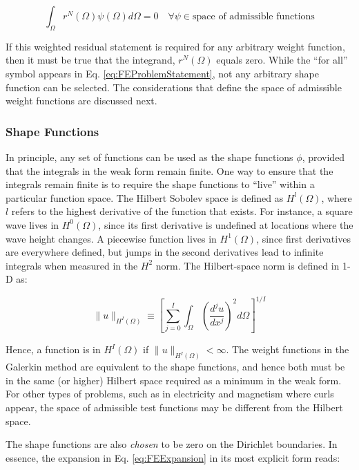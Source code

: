\documentclass[10pt]{article}
\numberwithin{equation}{section} %
\begin{document}
\begin{equation}
\label{eq:FEProblemStatement}
\int_{\Omega}r^N(\Omega)\psi(\Omega)d\Omega=0\quad\forall\psi\in \text{space of admissible functions}
\end{equation}

If this weighted residual statement is required for any arbitrary weight function, then it must be true that the integrand, \(r^N(\Omega)\) equals zero. While the ``for all'' symbol appears in Eq. \eqref{eq:FEProblemStatement}, not any arbitrary shape function can be selected. The considerations that define the space of admissible weight functions are discussed next.

\subsubsection{Shape Functions}

In principle, any set of functions can be used as the shape functions \(\phi\), provided that the integrals in the weak form remain finite. One way to ensure that the integrals remain finite is to require the shape functions to ``live'' within a particular function space. The Hilbert Sobolev space is defined as \(H^l(\Omega)\), where \(l\) refers to the highest derivative of the function that exists. For instance, a square wave lives in \(H^0(\Omega)\), since its first derivative is undefined at locations where the wave height changes. A piecewise function lives in \(H^1(\Omega)\), since first derivatives are everywhere defined, but jumps in the second derivatives lead to infinite integrals when measured in the \(H^2\) norm. The Hilbert-space norm is defined in 1-D as:

\begin{equation}
\|u\|_{H^I(\Omega)}\equiv\left\lbrack\sum_{j=0}^{I}\int_{\Omega}\left(\frac{d^ju}{dx^j}\right)^2d\Omega\right\rbrack^{1/I}
\end{equation}

Hence, a function is in \(H^I(\Omega)\) if \(\|u\|_{H^I(\Omega)}<\infty\). The weight functions in the Galerkin method are equivalent to the shape functions, and hence both must be in the same (or higher) Hilbert space required as a minimum in the weak form. For other types of problems, such as in electricity and magnetism where curls appear, the space of admissible test functions may be different from the Hilbert space. 

The shape functions are also \textit{chosen} to be zero on the Dirichlet boundaries. In essence, the expansion in Eq. \eqref{eq:FEExpansion} in its most explicit form reads:
\end{document}
